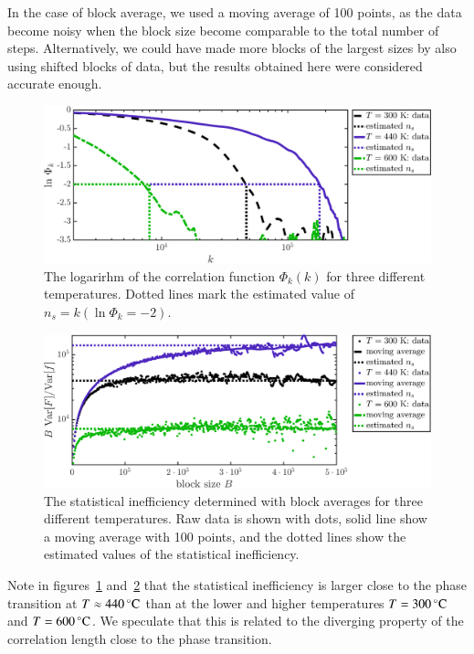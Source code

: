 In the case of block average, we used a moving average of 100 points, as the data become noisy when the block size become comparable to the total number of steps. Alternatively, we could have made more blocks of the largest sizes by also using shifted blocks of data, but the results obtained here were considered accurate enough. 

\begin{figure}[!ht]
\begin{center}
  \includegraphics[width=\textwidth]{../figures/stat_inefficiency_Phi} 
  \caption{The logarirhm of the correlation function $\Phi_k(k)$ for three different temperatures. Dotted lines mark the estimated value of $n_s = k (\ln \Phi_k = -2)$.}
  \label{fig:ns_phi}
\end{center}
\end{figure}

\begin{figure}[!ht]
\begin{center}
  \includegraphics[width=\textwidth]{../figures/stat_inefficiency_block} 
  \caption{The statistical inefficiency determined with block averages for three different temperatures. Raw data is shown with dots, solid line show a moving average with 100 points, and the dotted lines show the estimated values of the statistical inefficiency.}
  \label{fig:ns_block}
\end{center}
\end{figure}

Note in figures~\ref{fig:ns_phi} and~\ref{fig:ns_block} that the statistical inefficiency is larger close to the phase transition at $T \approx \unit[440]{^\circ C}$ than at the lower and higher temperatures  $T = \unit[300]{^\circ C}$ and $T = \unit[600]{^\circ C}$. We speculate that this is related to the diverging property of the correlation length close to the phase transition. 

